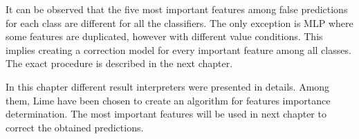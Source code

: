 It can be observed that the five most important features among false predictions for each class are different for all the classifiers. The only exception is MLP where some features are duplicated, however with different value conditions. This implies creating a correction model for every important feature among all classes. The exact procedure is described in the next chapter.

In this chapter different result interpreters were presented in details. Among them, Lime have been chosen to create an algorithm for features importance determination. The most important features will be used in next chapter to correct the obtained predictions. 